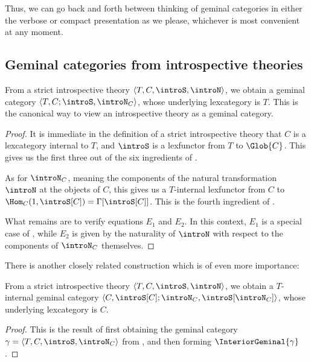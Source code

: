 Thus, we can go back and forth between thinking of geminal categories in either the verbose or compact presentation as we please, whichever is most convenient at any moment.

\subsection{Geminal categories from introspective theories}

\begin{construction}\label{IntrospAsGeminal}
From a strict introspective theory $\langle T, C, \introS, \introN \rangle$, we obtain a geminal category $\langle T, C; \introS, \introN_{C} \rangle$, whose underlying lexcategory is $T$. This is the canonical way to view an introspective theory as a geminal category.
\end{construction}
\begin{proof}
It is immediate in the definition of a strict introspective theory that $C$ is a lexcategory internal to $T$, and $\introS$ is a lexfunctor from $T$ to $\Glob{C}$. This gives us the first three out of the six ingredients of .

As for $\introN_{C}$, meaning the components of the natural transformation $\introN$ at the objects of $C$, this gives us a $T$-internal lexfunctor from $C$ to $\Hom_C(1, \introS[C]) = \Gamma[\introS[C]]$. This is the fourth ingredient of .

What remains are to verify equations $E_1$ and $E_2$. In this context, $E_1$ is a special case of , while $E_2$ is given by the naturality of $\introN$ with respect to the components of $\introN_C$ themselves.
\end{proof}

There is another closely related construction which is of even more importance:

\begin{construction}\label{IntrospContainsGeminal}
From a strict introspective theory $\langle T, C, \introS, \introN \rangle$, we obtain a $T$-internal geminal category $\langle C, \introS[C]; \introN_{C}, \introS[\introN_{C}] \rangle$, whose underlying lexcategory is $C$.
\end{construction}
\begin{proof}
This is the result of first obtaining the geminal category $\gamma = \langle T, C, \introS, \introN_C \rangle$ from , and then forming $\InteriorGeminal{\gamma}$.
\end{proof}


